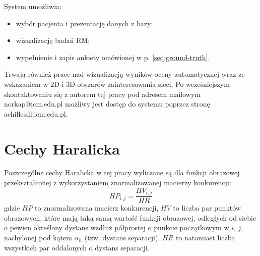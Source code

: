 System umożliwia:
\begin{itemize}[noitemsep,nolistsep]
	\item wybór pacjenta i prezentację danych z bazy;
	\item wizualizację badań RM;
	\item wypełnienie i zapis ankiety omówionej w p. \ref{seq:ground-truth}.
\end{itemize}

Trwają również prace nad wizualizacją wyników oceny automatycznej wraz \linebreak ze wskazaniem w 2D i 3D obszarów zainteresowania sieci. Po wcześniejszym skontaktowaniu się z autorem tej pracy pod adresem mailowym norkap@icm.edu.pl możliwy jest dostęp do systemu poprzez stronę achillesdl.icm.edu.pl.

\chapter{Cechy Haralicka}
\label{app:Haralick}
Poszczególne cechy Haralicka w tej pracy wyliczane są dla funkcji obrazowej przekształconej z wykorzystaniem znormalizowanej macierzy konkurencji: 
\begin{equation}
HP_{i,j} = \frac{HV_{i,j}}{HR}
\end{equation}
gdzie $HP$ to znormalizowana macierz konkurencji, $HV$ to liczba par punktów obrazowych, które mają taką samą wartość funkcji obrazowej, odległych od siebie o pewien określony dystans wzdłuż półprostej o punkcie początkowym w $i$, $j$, nachylonej pod kątem $\alpha_h$ (tzw. dystans separacji). $HR$ to natomiast liczba wszystkich par oddalonych o dystans separacji. 

